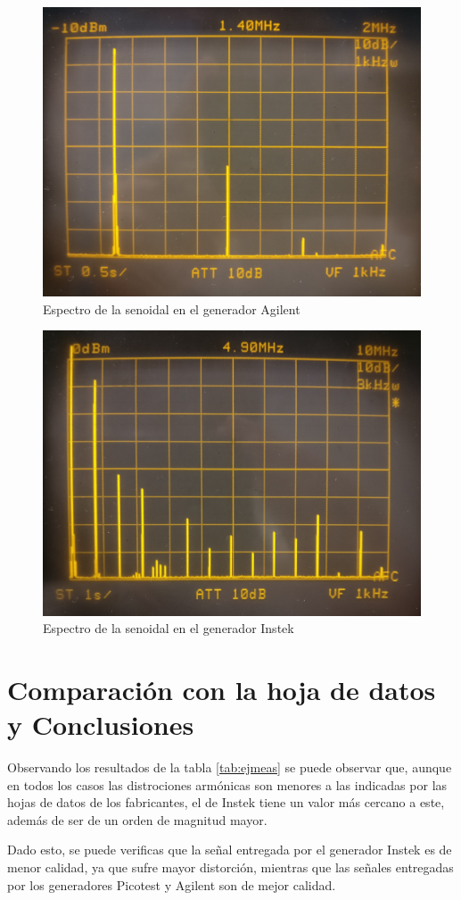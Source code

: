 \begin{figure}[ht]
    \begin{center}
        \includegraphics[width=0.5\linewidth]{contenido/img/espectro_senoidal.jpg}
        \caption{Espectro de la senoidal en el generador Agilent}
        \label{fig:espectro_agilent}
    \end{center}
\end{figure}

\begin{figure}[ht]
    \begin{center}
        \includegraphics[width=0.5\linewidth]{contenido/img/espectro_instek}
        \caption{Espectro de la senoidal en el generador Instek}
        \label{fig:espectro_instek}
    \end{center}
\end{figure}

\section{Comparación con la hoja de datos y Conclusiones}
Observando los resultados de la tabla \ref{tab:ejmeas} se puede observar que, aunque en todos
los casos las distrociones armónicas son menores a las indicadas por las hojas de datos de los
fabricantes, el de Instek tiene un valor más cercano a este, además de ser de un orden de magnitud
mayor.

Dado esto, se puede verificas que la señal entregada por el generador Instek es de menor calidad,
ya que sufre mayor distorción, mientras que las señales entregadas por los generadores Picotest y Agilent
son de mejor calidad.